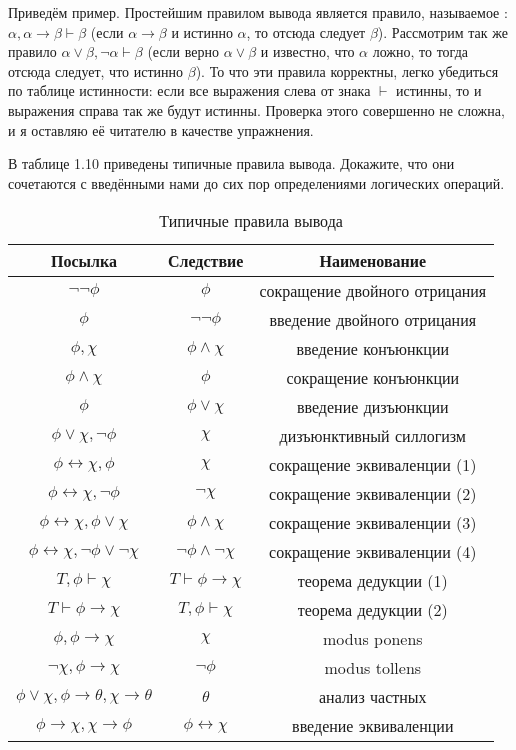 Приведём пример. Простейшим правилом вывода является правило, называемое : $\alpha, \alpha\to\beta \vdash \beta$ (если $\alpha\to\beta$ и истинно $\alpha$, то отсюда следует $\beta$). Рассмотрим так же правило $\alpha\lor\beta, \neg\alpha \vdash \beta$ (если верно $\alpha\lor\beta$ и известно, что $\alpha$ ложно, то тогда отсюда следует, что истинно $\beta$). То что эти правила корректны, легко убедиться по таблице истинности: если все выражения слева от знака $\vdash$ истинны, то и выражения справа так же будут истинны. Проверка этого совершенно не сложна, и я оставляю её читателю в качестве упражнения.

\begin{exercise}
В таблице 1.10 приведены типичные правила вывода. Докажите, что они сочетаются с введёнными нами до сих пор определениями логических операций.
\end{exercise}

\begin{table}[h]
\centering
\begin{tabular}{c c | c}
Посылка & Следствие & Наименование \\
\hline
$\neg\neg\phi$ & $\phi$ & сокращение двойного отрицания \\
$\phi$&$\neg\neg\phi$ & введение двойного отрицания \\
$\phi, \chi$ & $\phi \land \chi$ & введение конъюнкции \\
$\phi\land\chi$ & $\phi$ & сокращение конъюнкции \\
$\phi$ &  $\phi\lor\chi$ & введение дизъюнкции \\
$\phi\lor\chi, \neg\phi$ & $\chi$ & дизъюнктивный силлогизм \\
$\phi\leftrightarrow\chi, \phi$  & $\chi$ & сокращение эквиваленции (1) \\
$\phi\leftrightarrow\chi, \neg\phi$  & $\neg\chi$ & сокращение эквиваленции (2) \\
$\phi\leftrightarrow\chi, \phi\lor\chi$  & $\phi\land\chi$ & сокращение эквиваленции (3) \\
$\phi\leftrightarrow\chi, \neg\phi\lor\neg\chi$  & $\neg\phi\land\neg\chi$ & сокращение эквиваленции (4) \\
$T, \phi \vdash \chi$  & $T\vdash \phi\to\chi$ & теорема дедукции (1) \\
$T \vdash \phi\to\chi$  & $T, \phi\vdash\chi$ & теорема дедукции (2) \\
$\phi, \phi\to\chi$ & $\chi$ & modus ponens \\
$\neg \chi, \phi\to\chi$ & $\neg\phi$ & modus tollens \\
$\phi\lor\chi, \phi\to\theta, \chi\to\theta$ & $\theta$ & анализ частных \\
$\phi\to\chi, \chi\to\phi$ & $\phi\leftrightarrow\chi$ & введение эквиваленции
\end{tabular}
\caption{Типичные правила вывода}\label{table:kleene-or}
\end{table}

